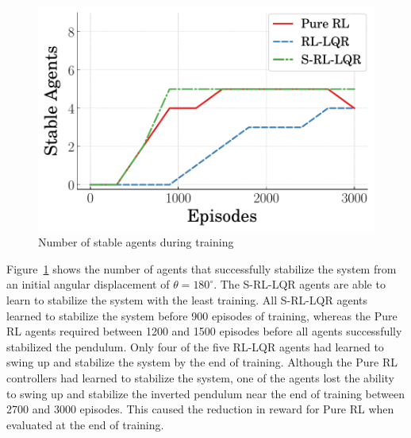 %
\begin{figure}[t]
    \centering
    \includegraphics[scale=0.65]{figures/figures_RL_model_based_control/inv_pend_num_stable}
    \caption{Number of stable agents during training}
    \label{fig:inv_pend_number_stable}
\end{figure}
%
Figure~\ref{fig:inv_pend_number_stable} shows the number of agents that successfully stabilize the system from an initial angular displacement of $\theta=180^{\circ}$. The S-RL-LQR agents are able to learn to stabilize the system with the least training. All S-RL-LQR agents learned to stabilize the system before 900 episodes of training, whereas the Pure RL agents required between 1200 and 1500 episodes before all agents successfully stabilized the pendulum.
%
Only four of the five RL-LQR agents had learned to swing up and stabilize the system by the end of training.
%
Although the Pure RL controllers had learned to stabilize the system, one of the agents lost the ability to swing up and stabilize the inverted pendulum near the end of training between 2700 and 3000 episodes. This caused the reduction in reward for Pure RL when evaluated at the end of training.

